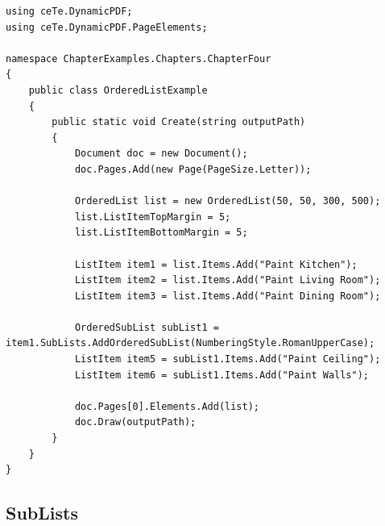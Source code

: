 \documentclass[american,letterpaper]{tufte-book}
\numberwithin{equation}{section}
\numberwithin{figure}{section}
\begin{document}
\bgroup{}
\begin{lstlisting}[caption={An ordered list.},label={lis:Adding-an-ordered},basicstyle={\small\ttfamily},breaklines=true]
using ceTe.DynamicPDF;
using ceTe.DynamicPDF.PageElements;

namespace ChapterExamples.Chapters.ChapterFour
{
    public class OrderedListExample
    {
        public static void Create(string outputPath)
        {
            Document doc = new Document();
            doc.Pages.Add(new Page(PageSize.Letter));
            
            OrderedList list = new OrderedList(50, 50, 300, 500);
            list.ListItemTopMargin = 5;
            list.ListItemBottomMargin = 5;

            ListItem item1 = list.Items.Add("Paint Kitchen");
            ListItem item2 = list.Items.Add("Paint Living Room");
            ListItem item3 = list.Items.Add("Paint Dining Room");

            OrderedSubList subList1 = item1.SubLists.AddOrderedSubList(NumberingStyle.RomanUpperCase);
            ListItem item5 = subList1.Items.Add("Paint Ceiling");
            ListItem item6 = subList1.Items.Add("Paint Walls");

            doc.Pages[0].Elements.Add(list);
            doc.Draw(outputPath);
        }
    }
}
\end{lstlisting}
\leavevmode\egroup

\subsection{SubLists}
\end{document}
